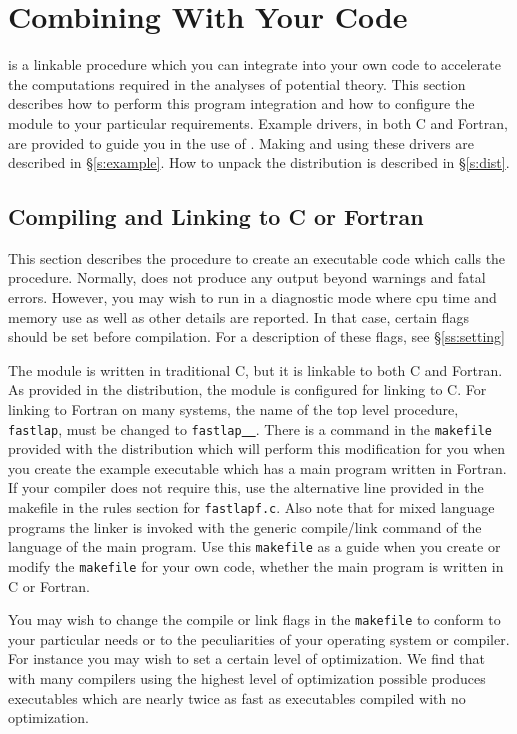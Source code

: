 \newpage
\section{Combining \fas With Your Code}
\label{s:using}

\fas is a linkable procedure which you can integrate into your own code
to accelerate the computations required in the analyses of potential
theory.  This section describes how to perform this program integration
and how to configure the \fas module to your particular requirements.
Example drivers, in both C and Fortran,  are provided  
to guide you in the use of \fas. Making and using these drivers are  
described in \S\ref{s:example}.  How to unpack the distribution
is described in \S\ref{s:dist}.

\subsection{Compiling \fas and Linking to C or Fortran}
\label{ss:comp}

This section describes the procedure to create an executable code 
which calls the \fas procedure.  Normally, \fas does not produce any output
beyond warnings and fatal errors.  However, you may wish to run \fas
in a diagnostic mode where cpu time and memory use as well as
other details are reported.  In that case, certain flags should be
set before compilation.  For a description of these flags, see
\S\ref{ss:setting}

The \fas module is written in traditional C, but it is linkable to both
C and Fortran.  As provided in the distribution, the module
is configured for linking to C.  For linking to Fortran on many  
systems, the name of the top level procedure, {\tt fastlap}, must 
be changed to {\tt fastlap}$\!$\underline{\ \ }.
There is a command in the {\tt makefile} provided with the distribution  
which will perform this modification for you when you create the 
example executable which has a main program written in Fortran.
If your compiler does not require this, use the alternative line
provided in the makefile in the rules section for {\tt fastlapf.c}.
Also note that for mixed language programs the linker is invoked
with the generic compile/link command of the language of the 
main program.  Use this {\tt makefile} as a guide when you create 
or modify the {\tt makefile} for your own code, whether the main 
program is written in C or Fortran.

You may wish to change the compile or link flags in the {\tt makefile} to 
conform to your particular needs or to the peculiarities of your 
operating system or compiler.  For instance you may wish to set a 
certain level of optimization.  We find that with many compilers 
using the highest level of optimization possible produces executables 
which are nearly twice as fast as executables compiled with no optimization.

